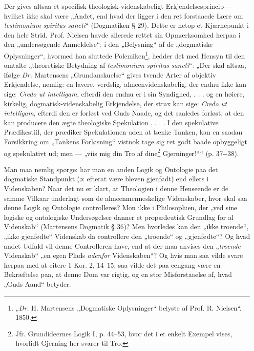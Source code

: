 \documentclass[12pt,a4paper]{book}
\newcommand{\opage}[1]{\marginnote{\footnotesize\textit{[#1]}}}
\begin{document}
Der gives altsaa et specifisk theologisk-videnskabeligt Erkjendelsesprincip
--- hvilket ikke skal være „Andet, end hvad
der ligger i den ret forstaaede Lære om \textit{testimonium spiritus
sancti}“ (Dogmatiken § 29). Dette er netop et Kjærnepunkt
i den hele Strid. Prof. Nielsen havde allerede rettet sin Opmærksomhed
herpaa i den „undersøgende Anmeldelse“; i den
„Belysning“ af de „dogmatiske Oplysninger“, hvormed han
sluttede Polemiken\footnote{„\textit{Dr.} H. Martensens „Dogmatiske Oplysninger“ belyste af Prof. R.
Nielsen“. 1850.}, hedder det med Hensyn til den omtalte
„theoretiske Betydning af \textit{testimonium spiritus sancti}“: „Der
skal altsaa, ifølge \textit{Dr.} Martensens „Grundanskuelse“ gives
tvende Arter af objektiv Erkjendelse, nemlig: en lavere, verdslig,
almeenvidenskabelig, der endnu ikke kan sige: \textit{Credo ut intelligam},
efterdi den endnu er i sin Syndighed, . . . og en
høiere, kirkelig, dogmatisk-videnskabelig Erkjendelse, der strax
kan sige: \textit{Credo ut intelligam}, efterdi den er forløst ved Guds
Naade, og det saaledes forløst, at den kan producere den ægte
theologiske Spekulation . . . . I den spekulative Prædikestiil,
der prædiker Spekulationen uden at tænke Tanken, kan en
saadan Forsikkring om „Tankens Forløsning“ vistnok tage sig
ret godt baade opbyggeligt og spekulativt ud; men --- „viis
mig din Tro af dine\footnote{Jfr. Grundideernes Logik I, p. 44--53, hvor det i et enkelt Exempel
vises, hvorlidt Gjerning her svarer til Tro.}
Gjerninger!““ (p. 37-{}-38).

\opage{35}\setcounter{footnote}{0}%
Man maa nemlig spørge: har man en anden Logik og
Ontologie paa det dogmatiske Standpunkt (ɔ: efterat være
bleven gjenfødt) end ellers i Videnskaben? Naar det nu er
klart, at Theologien i denne Henseende er de samme Vilkaar
underlagt som de almeenmenneskelige Videnskaber, hvor skal
saa denne Logik og Ontologie controlleres? Mon ikke i Philosophien,
der „ved sine logiske og ontologiske Undersøgelser
danner et propædeutisk Grundlag for al Videnskab“ (Martensens
Dogmatik § 36)? Men hvorledes kan den „ikke troende“, „ikke
gjenfødte“ Videnskab da controllere den „troende“ og „gjenfødte“?
Og hvad andet Udfald vil denne Controlleren have, end at
der maa anvises den „\emph{troende} Videnskab“ „en egen Plads
\emph{udenfor} Videnskaben“? Og hvis man saa vilde svare herpaa
med at citere 1 Kor. 2, 14--15, saa vilde det paa eengang
være en Bekræftelse paa, at denne Dom var rigtig, og en
stor Misforstaaelse af, hvad „Guds Aand“ betyder.
\end{document}
